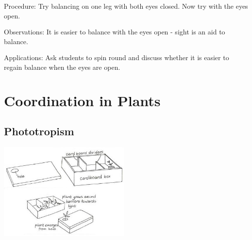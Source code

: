 \begin{multicols}{2}
\begin{description*}
\item[Procedure:]{Try balancing on one leg with
both eyes closed. Now try with
the eyes open. }
\item[Observations:]{It is easier to
balance with the eyes open -
sight is an aid to balance.}
\item[Applications:]{Ask students to spin round and
discuss whether it is easier to
regain balance when the eyes are
open.}
\end{description*}

\columnbreak


\section*{Coordination in Plants} 


\subsection{Phototropism}

\begin{center}
\includegraphics[width=0.49\textwidth]{./img/vso/phototropism.jpg}
\end{center}


\end{multicols}
